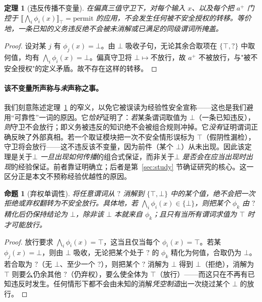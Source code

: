 \documentclass[11pt]{ctexart}
\newtheorem{theorem}{定理}
\newtheorem{proposition}{命题}
\begin{document}
\begin{theorem}[违反传播不变量]
\label{thm:soundness}
在偏真三值守卫下，对每个输入 $x$、以及每个把 $a^+$ 门控于 $\llbracket\bigwedge_i\phi_i(x)\rrbracket_\top=\text{permit}$ 的应用，不会发生任何被不安全授权的转移。等价地，一条已知的义务违反绝不会被未消解或已满足的同级谓词所掩盖。
\end{theorem}
\begin{proof}
设对某 $j$ 有 $\phi_j(x)=\bot$。由 $\bot$ 吸收子句，无论其余合取项在 $\{\top,?\}$ 中取何值，均有 $\bigwedge_i\phi_i(x)=\bot$。偏真守卫将 $\bot\mapsto\text{不放行}$，故 $a^+$ 不被放行，与"被不安全授权"的定义矛盾。故不存在这样的转移。
\end{proof}

\paragraph{该不变量所声称与\emph{未}声称之事。} 我们刻意陈述定理~\ref{thm:soundness} 的窄义，以免它被误读为经验性安全宣称——这也是我们避用“可靠性”一词的原因。它\emph{恰好}证明了：\emph{若}某条谓词取值为 $\bot$（一条已知违反），\emph{则}守卫不会放行；即义务被违反的知识绝不会被组合规则冲掉。它\emph{没有}证明谓词正确反映了外部真相。若一个取证模块把一次不安全情形误标为 $\top$（假阴性漏检），守卫将会放行——这不违反该不变量，因为前件（某个 $\bot$）从未出现。因此该定理是关于\emph{$\bot$ 一旦出现如何传播}的组合式保证，而非关于\emph{$\bot$ 是否会在应当出现时出现}的经验保证。前者靠证明确立；后者是第~\ref{sec:study} 节确证研究的核心。这一区分正是本文不预称经验优越性的原因。

\begin{proposition}[弃权单调性]
\label{prop:abstain}
将任意谓词从 $?$ 消解到 $\{\top,\bot\}$ 中的某个值，绝不会把一次拒绝或弃权翻转为不安全放行。具体地，若 $\bigwedge_i\phi_i(x)\in\{\bot\}$，则把某个 $\phi_k$ 由 $?$ 精化后仍保持结论为 $\bot$，除非该 $\bot$ 本就来自 $\phi_k$；且只有当\emph{所有}谓词求值为 $\top$ 时才可能放行。
\end{proposition}
\begin{proof}
放行要求 $\bigwedge_i\phi_i(x)=\top$，这当且仅当每个 $\phi_i(x)=\top$。若某 $\phi_j(x)=\bot$，则由 $\bot$ 吸收，无论把某个处于 $?$ 的 $\phi_k$ 精化为何值，合取仍为 $\bot$。若合取为 $?$（无 $\bot$、至少一个 $?$），则把某个 $?$ 消解为 $\bot$ 得到 $\bot$（拒绝），消解为 $\top$ 则要么仍余其他 $?$（仍弃权），要么使全体为 $\top$（放行）——而这只在不再有已知违反时发生。任何情形下都不会由未知的消解\emph{凭空制造}出一次绕过某个 $\bot$ 的放行。
\end{proof}
\end{document}
